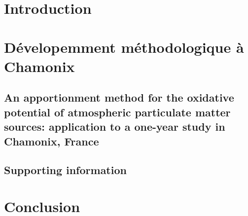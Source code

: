 \section{Introduction}

\section{Dévelopemment méthodologique à Chamonix}%
\label{sec:dévelopemment_méthodologique_à_chamonix}

\subsection{An apportionment method for the oxidative potential of atmospheric particulate matter sources: application to a one-year study in Chamonix, France}


\subsection{Supporting information}


\section{Conclusion}
